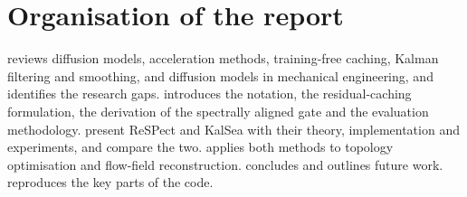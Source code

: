 \section{Organisation of the report}

 reviews diffusion models, acceleration methods, training-free caching, Kalman filtering and smoothing, and diffusion models in mechanical engineering, and identifies the research gaps.  introduces the notation, the residual-caching formulation, the derivation of the spectrally aligned gate and the evaluation methodology.  present ReSPect and KalSea with their theory, implementation and experiments, and compare the two.  applies both methods to topology optimisation and flow-field reconstruction.  concludes and outlines future work.  reproduces the key parts of the code.
